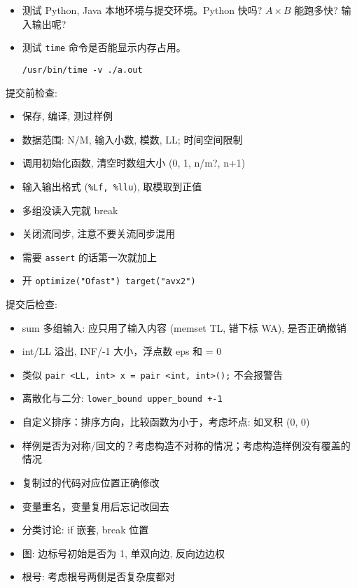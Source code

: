 \begin{small}
\begin{itemize}[leftmargin=1mm]
\begin{verbatim}
\end{verbatim}
    \item 测试 Python, Java 本地环境与提交环境。Python 快吗? $A\times B$ 能跑多快? 输入输出呢? 
    \item 测试 \texttt{time} 命令是否能显示内存占用。
\begin{verbatim}
/usr/bin/time -v ./a.out
\end{verbatim}
\end{itemize}
提交前检查: 
\begin{itemize}[leftmargin=1mm]
    \setlength{\itemsep}{0pt}
    \setlength{\parskip}{0.5pt}
\item 保存, 编译, 测过样例
\item 数据范围: N/M, 输入小数, 模数, LL; 时间空间限制
\item 调用初始化函数, 清空时数组大小 (0, 1, n/m?, n+1)
\item 输入输出格式 (\texttt{\%Lf, \%llu}), 取模取到正值
\item 多组没读入完就 break
\item 关闭流同步, 注意不要关流同步混用
\item 需要 \texttt{assert} 的话第一次就加上
\item 开 \texttt{optimize("Ofast") target("avx2")}
\end{itemize}
提交后检查:
\begin{itemize}[leftmargin=1mm]
\setlength{\itemsep}{0pt}
\setlength{\parskip}{0.5pt}
\item sum 多组输入: 应只用了输入内容 (memset TL, 错下标 WA), 是否正确撤销
\item int/LL 溢出, INF/-1 大小，浮点数 eps 和 = 0
\item 类似 \texttt{pair <LL, int> x = pair <int, int>();} 不会报警告 
\item 离散化与二分: \texttt{lower\_bound upper\_bound +-1}
\item 自定义排序：排序方向，比较函数为小于，考虑坏点: 如叉积 (0, 0)
\item 样例是否为对称/回文的？考虑构造不对称的情况；考虑构造样例没有覆盖的情况
\item 复制过的代码对应位置正确修改
\item 变量重名，变量复用后忘记改回去
\item 分类讨论: if 嵌套, break 位置
\item 图: 边标号初始是否为 1, 单双向边, 反向边边权
\item 根号: 考虑根号两侧是否复杂度都对
\end{itemize}
\end{small}